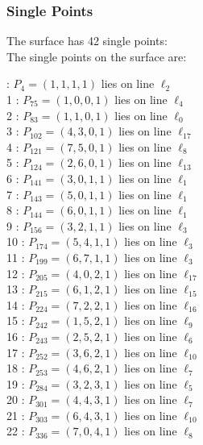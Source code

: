 \documentclass{article}
\begin{document}
{\subsubsection*{Single Points}
The surface has 42 single points:\\
The single points on the surface are:\\
\begin{multicols}{2}
 : $P_{4}=( 1, 1, 1, 1 )$ lies on line $\ell_{2}$\\
1 : $P_{75}=( 1, 0, 0, 1 )$ lies on line $\ell_{4}$\\
2 : $P_{83}=( 1, 1, 0, 1 )$ lies on line $\ell_{0}$\\
3 : $P_{102}=( 4, 3, 0, 1 )$ lies on line $\ell_{17}$\\
4 : $P_{121}=( 7, 5, 0, 1 )$ lies on line $\ell_{8}$\\
5 : $P_{124}=( 2, 6, 0, 1 )$ lies on line $\ell_{13}$\\
6 : $P_{141}=( 3, 0, 1, 1 )$ lies on line $\ell_{1}$\\
7 : $P_{143}=( 5, 0, 1, 1 )$ lies on line $\ell_{1}$\\
8 : $P_{144}=( 6, 0, 1, 1 )$ lies on line $\ell_{1}$\\
9 : $P_{156}=( 3, 2, 1, 1 )$ lies on line $\ell_{3}$\\
10 : $P_{174}=( 5, 4, 1, 1 )$ lies on line $\ell_{3}$\\
11 : $P_{199}=( 6, 7, 1, 1 )$ lies on line $\ell_{3}$\\
12 : $P_{205}=( 4, 0, 2, 1 )$ lies on line $\ell_{17}$\\
13 : $P_{215}=( 6, 1, 2, 1 )$ lies on line $\ell_{15}$\\
14 : $P_{224}=( 7, 2, 2, 1 )$ lies on line $\ell_{16}$\\
15 : $P_{242}=( 1, 5, 2, 1 )$ lies on line $\ell_{9}$\\
16 : $P_{243}=( 2, 5, 2, 1 )$ lies on line $\ell_{6}$\\
17 : $P_{252}=( 3, 6, 2, 1 )$ lies on line $\ell_{10}$\\
18 : $P_{253}=( 4, 6, 2, 1 )$ lies on line $\ell_{7}$\\
19 : $P_{284}=( 3, 2, 3, 1 )$ lies on line $\ell_{5}$\\
20 : $P_{301}=( 4, 4, 3, 1 )$ lies on line $\ell_{7}$\\
21 : $P_{303}=( 6, 4, 3, 1 )$ lies on line $\ell_{10}$\\
22 : $P_{336}=( 7, 0, 4, 1 )$ lies on line $\ell_{8}$\\

\end{multicols}}
\end{document}
